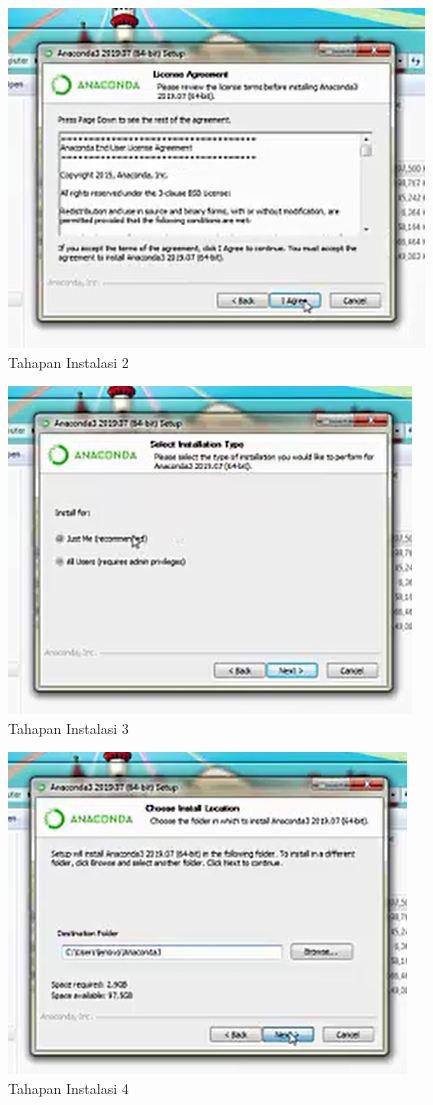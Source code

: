 	\begin{figure}
	\includegraphics[scale=0.5]{section/2.png}
	\centering
	\caption{Tahapan Instalasi 2}
	\end{figure}

	\begin{figure}
	\includegraphics[scale=0.5]{section/3.png}
	\centering
	\caption{Tahapan Instalasi 3}
	\end{figure}

	\begin{figure}
	\includegraphics[scale=0.5]{section/4.png}
	\centering
	\caption{Tahapan Instalasi 4}
	\end{figure}

